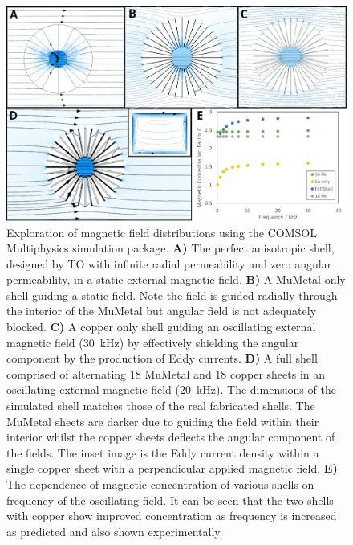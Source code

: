 \documentclass[11pt]{iopart}
\begin{document}
\begin{figure}
  \begin{center}
   \noindent\includegraphics[width=0.89\linewidth]{images/compoundCOMSOL.png}
  \end{center}
  \caption{
    Exploration of magnetic field distributions using the COMSOL
    Multiphysics simulation package.
    \textbf{A)} The perfect anisotropic shell, designed by TO with
    infinite radial permeability and zero angular permeability, in a
    static external magnetic field.
    \textbf{B)} A MuMetal only shell guiding a static field. Note the
    field is guided radially through the interior of the MuMetal but
    angular field is not adequately blocked.
    \textbf{C)} A copper only shell guiding an oscillating external
    magnetic field ($30$~kHz) by effectively shielding the angular component by
    the production of Eddy currents.
    \textbf{D)} A full shell comprised of alternating $18$ MuMetal and
    $18$ copper sheets in an oscillating external magnetic field
    ($20$~kHz). The dimensions of the simulated shell matches those of
    the real fabricated shells. The MuMetal sheets are darker due to
    guiding the field within their interior whilst the copper sheets
    deflects the angular component of the fields.  The inset image is
    the Eddy current density within a single copper sheet with a
    perpendicular applied magnetic field.
    \textbf{E)} The dependence of magnetic concentration of various
    shells on frequency of the oscillating field. It can be seen that
    the two shells with copper show improved concentration as
    frequency is increased as predicted and also shown experimentally.
  }
  \label{fig:COMSOL}
\end{figure}
\end{document}
